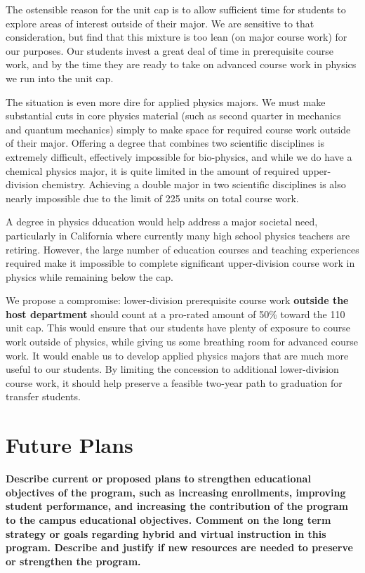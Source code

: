 \documentclass[12pt]{article}
\begin{document}
The ostensible reason for the unit cap is to allow sufficient time for
students to explore areas of interest outside of their major.  We are
sensitive to that consideration, but find that this mixture is too
lean (on major course work) for our purposes.  Our students invest a
great deal of time in prerequisite course work, and by the time they
are ready to take on advanced course work in physics we run into the
unit cap.

The situation is even more dire for applied physics majors.  We must
make substantial cuts in core physics material (such as second quarter
in mechanics and quantum mechanics) simply to make space for required
course work outside of their major.  Offering a degree that combines
two scientific disciplines is extremely difficult, effectively
impossible for bio-physics, and while we do have a chemical physics major,
it is quite limited in the amount of required upper-division chemistry.
Achieving a double major in two scientific disciplines is also nearly
impossible due to the limit of 225 units on total course work.

A degree in physics dducation would help address a major societal
need, particularly in California where currently many high school
physics teachers are retiring.  However, the large number of education courses and teaching experiences
required make it impossible to complete significant upper-division course work in physics while remaining below the cap.

We propose a compromise: lower-division prerequisite course work {\bf
  outside the host department} should count at a pro-rated amount of
50\% toward the 110 unit cap.  This would ensure that our students
have plenty of exposure to course work outside of physics, while
giving us some breathing room for advanced course work.  It would
enable us to develop applied physics majors that are much more useful
to our students.  By limiting the concession to additional
lower-division course work, it should help preserve a feasible
two-year path to graduation for transfer students.

\newpage
\section{Future Plans}
\label{sec:future}
{\bf Describe current or proposed plans to strengthen educational
  objectives of the program, such as increasing enrollments, improving
  student performance, and increasing the contribution of the program
  to the campus educational objectives. Comment on the long term
  strategy or goals regarding hybrid and virtual instruction in this
  program. Describe and justify if new resources are needed to
  preserve or strengthen the program.}
\end{document}
